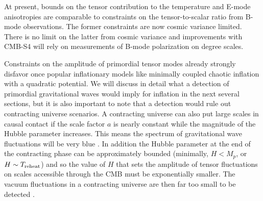 At present, bounds on the tensor contribution to the temperature and E-mode anisotropies are comparable to constraints on the tensor-to-scalar ratio from B-mode observations. The former constraints are now cosmic variance limited. There is no limit on the latter from cosmic variance and improvements with CMB-S4 will rely on measurements of B-mode polarization on degree scales.

Constraints on the amplitude of primordial tensor modes already strongly disfavor once popular inflationary models like minimally coupled chaotic inflation with a quadratic potential.  We will discuss in detail what a detection of primordial gravitational waves would imply for inflation in the next several sections, but it is also important to note that a detection would rule out contracting universe scenarios. A contracting universe can also put large scales in causal contact if the scale factor $a$ is nearly constant while the magnitude of the Hubble parameter increases. This means the spectrum of gravitational wave fluctuations will be very blue \cite{Khoury:2001wf}. In addition the Hubble parameter at the end of the contracting phase can be approximately bounded (minimally, $H<M_p$, or $H\sim T_{\rm reheat}$) and so the value of $H$ that sets the amplitude of tensor fluctuations on scales accessible through the CMB must be exponentially smaller. The vacuum fluctuations in a contracting universe are then far too small to be detected \cite{Boyle:2003km}.


